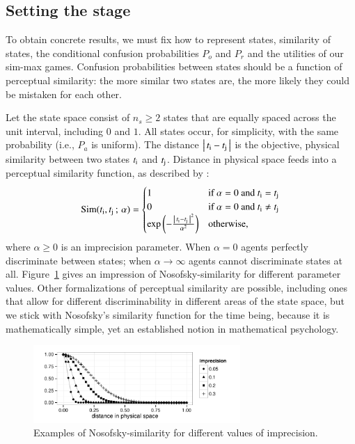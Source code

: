\documentclass[fleqn,reqno,10pt]{article}
\newcommand{\imprecision}{\ensuremath{\alpha}} %
\newcommand{\ns}{\ensuremath{n_s}} %
\newcommand{\similarity}{\ensuremath{\mathrm{Sim}}} %
\begin{document}
\subsection{Setting the stage}
\label{sec:setting-stage}

To obtain concrete results, we must fix how to represent states, similarity of states, the
conditional confusion probabilities $P_o$ and $P_r$ and the utilities of our sim-max
games. Confusion probabilities between states should be a function of perceptual similarity:
the more similar two states are, the more likely they could be mistaken for each other. 

Let the state space consist of $\ns \ge 2$ states that are equally spaced across the unit
interval, including $0$ and $1$. All states occur, for simplicity, with the same probability
(i.e., $P_a$ is uniform).  The distance $\left \lvert \, t_{\mathrm{i}} - t_{\mathrm{j}} \, \right\rvert$ is the objective,
physical similarity between two states $t_{\mathrm{i}}$ and $t_{\mathrm{j}}$. Distance in physical
space feeds into a perceptual similarity function, as described by
\citet{Nosofsky1986:Attention-Simil}:
\begin{align*}
  \similarity(\mystate{i}, \mystate{j} \myts ; \myts \imprecision) =
      \begin{cases}
    1 & \textrm{if } \imprecision = 0 \textrm{ and } \mystate{i} = \mystate{j} \\
    0 & \textrm{if } \imprecision = 0 \textrm{ and } \mystate{i} \neq \mystate{j} \\
 \expo \left ( -  \frac{\card{\mystate{i} - \mystate{j}}^2}{ \imprecision^2} \right ) & \textrm{otherwise,} \\
    \end{cases}
\end{align*}
where $\imprecision \ge 0$ is an imprecision parameter. When $\imprecision=0$ agents perfectly
discriminate between states; when $\imprecision \rightarrow \infty$ agents cannot discriminate
states at all. Figure~\ref{fig:NosofskySim} gives an impression of Nosofsky-similarity for
different parameter values. Other formalizations of perceptual similarity are possible,
including ones that allow for different discriminability in different areas of the state space,
but we stick with Nosofsky's similarity function for the time being, because it is
mathematically simple, yet an established notion in mathematical psychology.

\begin{figure}
  \centering

  \includegraphics[width=0.7\textwidth]{plots/NosofskySim.pdf}

  \caption{Examples of Nosofsky-similarity for different values of
    imprecision.}
  \label{fig:NosofskySim}
\end{figure}
\end{document}
